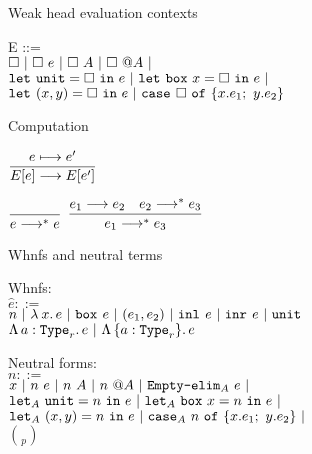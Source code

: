 
\begin{frame}{Weak head evaluation contexts}

E ::=\\
\qquad $\square \ |\  \square\ e \ |\  \square\ A \ |\  \square\ @A \ |\ $ \\
\qquad $\unitelim{\square}{e} \pipe \boxelim{x}{\square}{e} \pipe$ \\
\qquad $\letpair{x}{y}{\square}{e} \pipe \newcase{\square}{x}{e_1}{y}{e_2}$

\end{frame}

\begin{frame}{Computation}

\begin{center}
  $\infrule{\contraction{e}{e'}}{\reduction{\plug{E}{e}}{\plug{E}{e'}}}$

  \vspace{2em}

  $\infrule{}{\reductions{e}{e}}$ \quad
  $\infrule{\reduction{e_1}{e_2} \quad \reductions{e_2}{e_3}}{\reductions{e_1}{e_3}}$
\end{center}

\end{frame}

\begin{frame}{Whnfs and neutral terms}

Whnfs: \\
$\hat{e} ::=$ \\
\qquad $n \pipe \fun{x}{e} \pipe \boxintro{e} \pipe \pair{e_1}{e_2} \pipe \inl{e} \pipe \inr{e} \pipe \unit$ \\
\qquad $\tfun{a}[r]{e} \pipe \itfun{a}[r]{e}$

\vspace{2em}

Neutral forms: \\
$n ::=$ \\
\qquad $x \pipe \app{n}{e} \pipe \tapp{n}{A} \pipe \itapp{n}{A} \pipe \emptyelim{e}[A] \pipe$ \\
\qquad $\unitelim{n}{e}[A] \pipe \boxelim{x}{n}{e}[A] \pipe$ \\
\qquad $\letpair{x}{y}{n}{e}[A] \pipe \newcase{n}{x}{e_1}{y}{e_2}[A] \pipe$ \\
\qquad $\choose{p}$

\end{frame}

